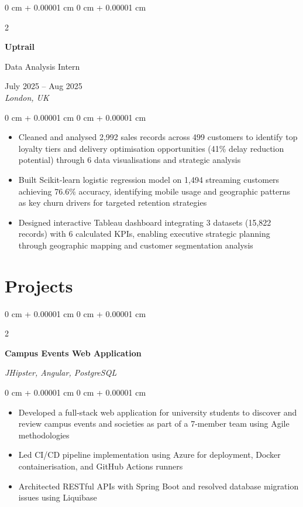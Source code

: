 \documentclass[10pt, a4paper]{article}
\newenvironment{highlights}{
    \begin{itemize}[
        topsep=0.10 cm,
        parsep=0.10 cm,
        partopsep=0pt,
        itemsep=0pt,
        leftmargin=20pt
    ]
}{
    \end{itemize}
} %
\newenvironment{onecolentry}{
    \begin{adjustwidth}{
        0 cm + 0.00001 cm
    }{
        0 cm + 0.00001 cm
    }
}{
    \end{adjustwidth}
} %
\newenvironment{twocolentry}[2][]{
    \onecolentry
    \def\secondColumn{#2}
    \setcolumnwidth{\fill, 4.5 cm}
    \begin{paracol}{2}
}{
    \switchcolumn \raggedleft \secondColumn
    \end{paracol}
    \endonecolentry
} %
\begin{document}
    \vspace{0.15 cm}

    \begin{twocolentry}{
        July 2025 -- Aug 2025 \\
        \textit{London, UK}
    }
        \textbf{Uptrail}
        
        Data Analysis Intern
    \end{twocolentry}

    \vspace{0.10 cm}
    \begin{onecolentry}
        \begin{highlights}
            \item Cleaned and analysed 2,992 sales records across 499 customers to identify top loyalty tiers and delivery optimisation opportunities (41\% delay reduction potential) through 6 data visualisations and strategic analysis
            \item Built Scikit-learn logistic regression model on 1,494 streaming customers achieving 76.6\% accuracy, identifying mobile usage and geographic patterns as key churn drivers for targeted retention strategies
            \item Designed interactive Tableau dashboard integrating 3 datasets (15,822 records) with 6 calculated KPIs, enabling executive strategic planning through geographic mapping and customer segmentation analysis
        \end{highlights}
    \end{onecolentry}

    \vspace{0.15 cm}

    \section{Projects}


    \begin{twocolentry}{
        \textit{JHipster, Angular, PostgreSQL}
    }
        \textbf{Campus Events Web Application}
    \end{twocolentry}

    \vspace{0.10 cm}
    \begin{onecolentry}
        \begin{highlights}
            \item Developed a full-stack web application for university students to discover and review campus events and societies as part of a 7-member team using Agile methodologies
            \item Led CI/CD pipeline implementation using Azure for deployment, Docker containerisation, and GitHub Actions runners
            \item Architected RESTful APIs with Spring Boot and resolved database migration issues using Liquibase
        \end{highlights}
    \end{onecolentry}
\end{document}
